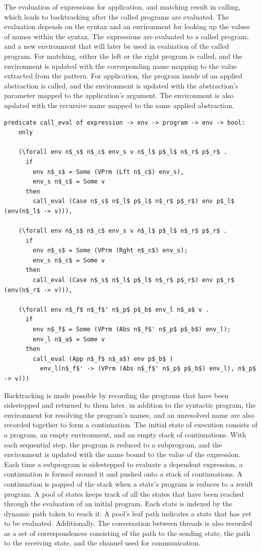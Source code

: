 \documentclass[10pt]{article}
\begin{document}
The evaluation of expressions for application, and matching result in calling, which leads to
backtracking after the called programs are evaluated. The evaluation depends on the syntax
and an environment for looking up the values of names within the syntax.
The expressions are evaluated to a called program, and a new environment that will
later be used in evaluation of the called program. For matching, either the left or the right
program is called, and the environment is updated with the corresponding name mapping to the
value extracted from the pattern. For application, the program inside of an applied abstraction
is called, and the environment is updated with the abstraction's parameter mapped to the
application's argument. The environment is also updated with the recursive name mapped to the
same applied abstraction.

\begin{lstlisting}[language=logic, mathescape]
  predicate call_eval of expression -> env -> program -> env -> bool:
    only

    (\forall env n$_s$ n$_c$ env_s v n$_l$ p$_l$ n$_r$ p$_r$ .
      if
        env n$_s$ = Some (VPrm (Lft n$_c$) env_s),
        env_s n$_c$ = Some v
      then
        call_eval (Case n$_s$ n$_l$ p$_l$ n$_r$ p$_r$) env p$_l$ (env(n$_l$ -> v))),

    (\forall env n$_s$ n$_c$ env_s v n$_l$ p$_l$ n$_r$ p$_r$ .
      if 
        env n$_s$ = Some (VPrm (Rght n$_c$) env_s); 
        env_s n$_c$ = Some v
      then
        call_eval (Case n$_s$ n$_l$ p$_l$ n$_r$ p$_r$) env p$_r$ (env(n$_r$ -> v))),

    (\forall env n$_f$ n$_f$' n$_p$ p$_b$ env_l n$_a$ v .
      if 
        env n$_f$ = Some (VPrm (Abs n$_f$' n$_p$ p$_b$) env_l); 
        env_l n$_a$ = Some v
      then
        call_eval (App n$_f$ n$_a$) env p$_b$ (
          env_l(n$_f$' -> (VPrm (Abs n$_f$' n$_p$ p$_b$) env_l), n$_p$ -> v)))
  \end{lstlisting}
  

Backtracking is made possible by recording the programs that have been sidestepped and
returned to them later. in addition to the syntactic program, the environment for resolving the
program's names, and an unresolved name are also recorded together to form a continuation. 
The initial state of execution consists of a program, an empty environment, and an empty stack
of continuations. With each sequential step, the program is reduced to a subprogram, and the
environment is updated with the name bound to the value of the expression. Each time a
subprogram is sidestepped to evaluate a dependent expression, a continuation is formed around
it and pushed onto a stack of continuations. A continuation is popped of the stack when a
state's program is reduces to a result program.  A pool of states keeps track of all the states
that have been reached through the evaluation of an initial program.  Each state is indexed by
the dynamic path taken to reach it. A pool's leaf path indicates a state that has yet to be
evaluated. Additionally, The conversation between threads is also recorded as a set of
correspondences consisting of the path to the sending state, the path to the receiving state,
and the channel used for communication.  
\end{document}
